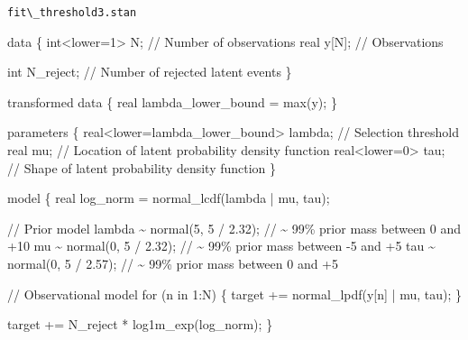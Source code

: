 \documentclass[
  letterpaper,
  DIV=11,
  numbers=noendperiod]{scrartcl}
\newenvironment{Shaded}{\begin{snugshade}}{\end{snugshade}}
\newcommand{\CommentTok}[1]{\textcolor[rgb]{0.37,0.37,0.37}{#1}}
\newcommand{\ControlFlowTok}[1]{\textcolor[rgb]{0.00,0.23,0.31}{#1}}
\newcommand{\DataTypeTok}[1]{\textcolor[rgb]{0.68,0.00,0.00}{#1}}
\newcommand{\DecValTok}[1]{\textcolor[rgb]{0.68,0.00,0.00}{#1}}
\newcommand{\FloatTok}[1]{\textcolor[rgb]{0.68,0.00,0.00}{#1}}
\newcommand{\KeywordTok}[1]{\textcolor[rgb]{0.00,0.23,0.31}{#1}}
\newcommand{\NormalTok}[1]{\textcolor[rgb]{0.00,0.23,0.31}{#1}}
\begin{document}
\begin{codelisting}

\caption{\texttt{fit\textbackslash\_threshold3.stan}}

\begin{Shaded}
\begin{Highlighting}[]
\KeywordTok{data}\NormalTok{ \{}
  \DataTypeTok{int}\NormalTok{\textless{}}\KeywordTok{lower}\NormalTok{=}\DecValTok{1}\NormalTok{\textgreater{} N; }\CommentTok{// Number of observations}
  \DataTypeTok{real}\NormalTok{ y[N];      }\CommentTok{// Observations}
  
  \DataTypeTok{int}\NormalTok{ N\_reject; }\CommentTok{// Number of rejected latent events}
\NormalTok{\}}

\KeywordTok{transformed data}\NormalTok{ \{}
  \DataTypeTok{real}\NormalTok{ lambda\_lower\_bound = max(y);}
\NormalTok{\}}

\KeywordTok{parameters}\NormalTok{ \{}
  \DataTypeTok{real}\NormalTok{\textless{}}\KeywordTok{lower}\NormalTok{=lambda\_lower\_bound\textgreater{} lambda; }\CommentTok{// Selection threshold}
  \DataTypeTok{real}\NormalTok{ mu;           }\CommentTok{// Location of latent probability density function}
  \DataTypeTok{real}\NormalTok{\textless{}}\KeywordTok{lower}\NormalTok{=}\DecValTok{0}\NormalTok{\textgreater{} tau; }\CommentTok{// Shape of latent probability density function}
\NormalTok{\}}

\KeywordTok{model}\NormalTok{ \{}
  \DataTypeTok{real}\NormalTok{ log\_norm = normal\_lcdf(lambda | mu, tau);}
  
  \CommentTok{// Prior model}
\NormalTok{  lambda \textasciitilde{} normal(}\DecValTok{5}\NormalTok{, }\DecValTok{5}\NormalTok{ / }\FloatTok{2.32}\NormalTok{); }\CommentTok{// \textasciitilde{} 99\% prior mass between  0 and +10}
\NormalTok{  mu \textasciitilde{} normal(}\DecValTok{0}\NormalTok{, }\DecValTok{5}\NormalTok{ / }\FloatTok{2.32}\NormalTok{);     }\CommentTok{// \textasciitilde{} 99\% prior mass between {-}5 and +5}
\NormalTok{  tau \textasciitilde{} normal(}\DecValTok{0}\NormalTok{, }\DecValTok{5}\NormalTok{ / }\FloatTok{2.57}\NormalTok{);    }\CommentTok{// \textasciitilde{} 99\% prior mass between  0 and +5}
  
  \CommentTok{// Observational model}
  \ControlFlowTok{for}\NormalTok{ (n }\ControlFlowTok{in} \DecValTok{1}\NormalTok{:N) \{}
    \KeywordTok{target +=}\NormalTok{ normal\_lpdf(y[n] | mu, tau);}
\NormalTok{  \}}
  
  \KeywordTok{target +=}\NormalTok{ N\_reject * log1m\_exp(log\_norm);}
\NormalTok{\}}


\end{Highlighting}
\end{Shaded}
\end{codelisting}
\end{document}
